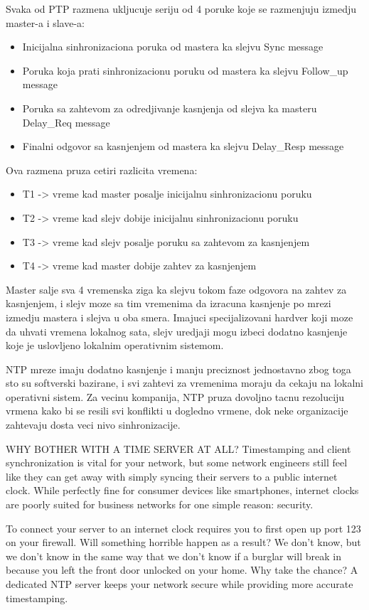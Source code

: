 \documentclass[a4paper,12pt, master]{etf}
\begin{document}
	Svaka od PTP razmena ukljucuje seriju od 4 poruke koje se razmenjuju izmedju master-a i 
	slave-a:
	\begin{itemize}
		\item Inicijalna sinhronizaciona poruka od mastera ka slejvu {Sync message}
		\item Poruka koja prati sinhronizacionu poruku od mastera ka slejvu {Follow\_up message}
		\item Poruka sa zahtevom za odredjivanje kasnjenja od slejva ka masteru {Delay\_Req 
		message}
		\item Finalni odgovor sa kasnjenjem od mastera ka slejvu {Delay\_Resp message}
	\end{itemize}
	Ova razmena pruza cetiri razlicita vremena:
	\begin{itemize}
		\item T1 -> vreme kad master posalje inicijalnu sinhronizacionu poruku
		\item T2 -> vreme kad slejv dobije inicijalnu sinhronizacionu poruku
		\item T3 -> vreme kad slejv posalje poruku sa zahtevom za kasnjenjem
		\item T4 -> vreme kad master dobije zahtev za kasnjenjem
	\end{itemize}
	Master salje sva 4 vremenska ziga ka slejvu tokom faze odgovora na zahtev za kasnjenjem, 
	i slejv moze sa tim vremenima da izracuna kasnjenje po mrezi izmedju mastera i slejva u 
	oba smera. Imajuci specijalizovani hardver koji moze da uhvati vremena lokalnog sata, 
	slejv uredjaji mogu izbeci dodatno kasnjenje koje je uslovljeno lokalnim operativnim 
	sistemom.

	NTP mreze imaju dodatno kasnjenje i manju preciznost jednostavno zbog toga sto su 
	softverski bazirane, i svi zahtevi za vremenima moraju da cekaju na lokalni operativni 
	sistem. Za vecinu kompanija, NTP pruza dovoljno tacnu rezoluciju vrmena kako bi se resili 
	svi konflikti u dogledno vrmene, dok neke organizacije zahtevaju dosta veci nivo 
	sinhronizacije.

	WHY BOTHER WITH A TIME SERVER AT ALL?
	Timestamping and client synchronization is vital for your network, but some network 
	engineers still feel like they can get away with simply syncing their servers to a public 
	internet clock. While perfectly fine for consumer devices like smartphones, internet 
	clocks are poorly suited for business networks for one simple reason: security.

	To connect your server to an internet clock requires you to first open up port 123 on 
	your firewall. Will something horrible happen as a result? We don't know, but we don't 
	know in the same way that we don't know if a burglar will break in because you left the 
	front door unlocked on your home. Why take the chance? A dedicated NTP server keeps your 
	network secure while providing more accurate timestamping.
\end{document}
